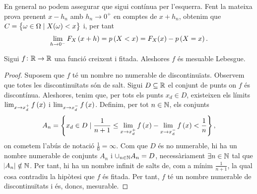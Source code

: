 \begin{obs}
  En general no podem assegurar que sigui contínua per l'esquerra. Fent la mateixa prova prenent $x-h_n$ amb $h_n\to 0^+$ en comptes de $x+h_n$, obtenim que
  $C=\left\{ \omega\in\Omega\mid X(\omega)<x\right\}$ i, per tant
  \[
   \lim\limits_{h\to 0^-} F_X\left( x+h\right) = p\left( X<x\right) = F_X(x)-p\left( X=x\right).
  \]
\end{obs}

\begin{lema}
 Sigui $f\colon \mathbb{R} \to \mathbb{R}$ una funció creixent i fitada. Aleshores $f$ és mesuable Lebesgue.
\end{lema}
\begin{proof}
    Suposem que $f$ té un nombre no numerable de discontinuïats. Observem que totes les discontinuïtats són de salt. Sigui $D\subseteq \mathbb{R}$ el conjunt de punts on $f$ és discontínua. Aleshores, tenim que, per tots els punts $x_d\in D$, existeixen els límits $\lim_{x\to x_d^+}f\left( x\right)$ i $\lim_{x\to x_d^-}f\left( x\right)$. Definim, per tot $n\in\mathbb{N}$, els conjunts
    \[
        A_n=\left\{ x_d\in D\mid \frac{1}{n+1}\leq\lim_{x\to x_d^+}f\left( x\right)-\lim_{x\to x_d^-}f\left( x\right)<\frac{1}{n}\right\},
    \]
    on cometem l'abús de notació $\frac{1}{0}=\infty$. Com que $D$ és no numerable, hi ha un nombre numerable de conjunts $A_n$ i $\cup_{n\in\mathbb{N}}A_n=D$, necessàriament $\exists n\in\mathbb{N}$ tal que $\abs{A_n}\notin\mathbb{N}$. Per tant, hi ha un nombre infinit de salts de, com a mínim $\frac{1}{n+1}$, la qual cosa contradiu la hipòtesi que $f$ és fitada. Per tant, $f$ té un nombre numerable de discontinuïtats i és, doncs, mesurable.
\end{proof}

